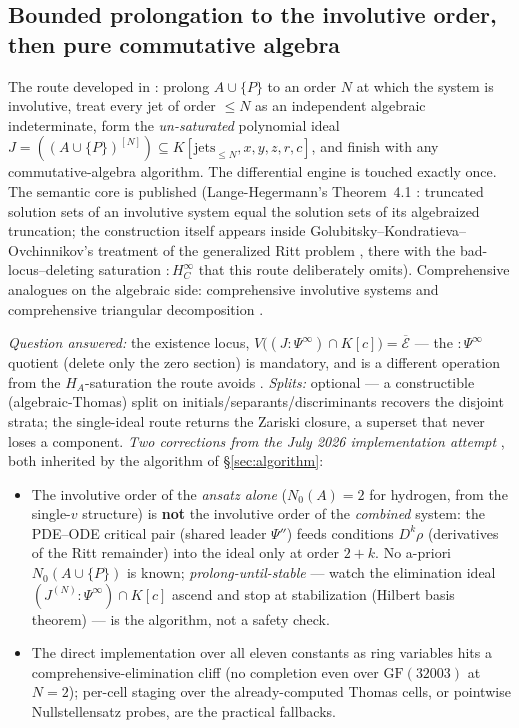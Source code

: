 \documentclass[11pt]{article}
\newcommand{\Psib}{\Psi}
\newcommand{\Ex}{\mathcal{E}}
\begin{document}
\subsection{Bounded prolongation to the involutive order, then pure
commutative algebra}
\label{sec:bounded-prolongation}

The route developed in \cite{bounded-prolongation-note}: prolong
$A\cup\{P\}$ to an order $N$ at which the system is involutive, treat every
jet of order $\le N$ as an independent algebraic indeterminate, form the
\emph{un-saturated} polynomial ideal
$J = ((A\cup\{P\})^{[N]}) \subseteq K[\text{jets}_{\le N}, x,y,z,r, c]$, and
finish with any commutative-algebra algorithm. The differential engine is
touched exactly once. The semantic core is published (Lange-Hegermann's
Theorem~4.1 \cite{LH2014}: truncated solution sets of an involutive system
equal the solution sets of its algebraized truncation; the construction
itself appears inside Golubitsky--Kondratieva--Ovchinnikov's treatment of the
generalized Ritt problem \cite{GKO2009}, there with the bad-locus--deleting
saturation $:H^\infty_C$ that this route deliberately omits). Comprehensive
analogues on the algebraic side: comprehensive involutive systems
\cite{gerdt-hashemi} and comprehensive triangular decomposition
\cite{CTD2007,chen-morenomaza}.

\emph{Question answered:} the existence locus,
$V\bigl((J:\Psib^\infty)\cap K[c]\bigr) = \overline{\Ex}$ --- the
$:\Psib^\infty$ quotient (delete only the zero section) is mandatory, and is
a different operation from the $H_A$-saturation the route avoids
\cite[\S2bis]{bounded-prolongation-note}. \emph{Splits:} optional --- a
constructible (algebraic-Thomas) split on initials/separants/discriminants
recovers the disjoint strata; the single-ideal route returns the Zariski
closure, a superset that never loses a component. \emph{Two corrections from
the July 2026 implementation attempt} \cite{existence-route-report}, both
inherited by the algorithm of \S\ref{sec:algorithm}:
\begin{itemize}
\item The involutive order of the \emph{ansatz alone} ($N_0(A) = 2$ for
hydrogen, from the single-$v$ structure) is \textbf{not} the involutive order
of the \emph{combined} system: the PDE--ODE critical pair (shared leader
$\Psib''$) feeds conditions $D^k\rho$ (derivatives of the Ritt remainder) into
the ideal only at order $2+k$. No a-priori $N_0(A\cup\{P\})$ is known;
\emph{prolong-until-stable} --- watch the elimination ideal
$(J^{(N)}:\Psib^\infty)\cap K[c]$ ascend and stop at stabilization (Hilbert
basis theorem) --- is the algorithm, not a safety check.
\item The direct implementation over all eleven constants as ring variables
hits a comprehensive-elimination cliff (no completion even over
$\mathrm{GF}(32003)$ at $N=2$); per-cell staging over the already-computed
Thomas cells, or pointwise Nullstellensatz probes, are the practical
fallbacks.
\end{itemize}
\end{document}
